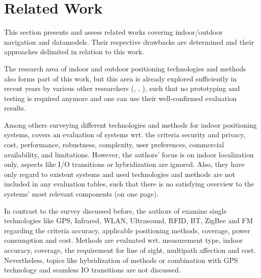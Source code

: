 \chapter{Related Work}


This section presents and assess related works covering indoor/outdoor navigation and datamodels. Their respective drawbacks are determined and their approaches delimited in relation to this work.

The research area of indoor and outdoor positioning technologies and methods also forms part of this work, but this area is already explored sufficiently in recent years by various other researchers (\cite{seamlessIOsolutions}, \cite{surveyIPS}, \cite{recentAdvances}), such that no prototyping and testing is required anymore and one can use their well-confirmed evaluation results.

Among others surveying different technologies and methods for indoor positioning systems, \cite{surveyIPS} covers an evaluation of systems wrt. the criteria security and privacy, cost, performance, robustness, complexity, user preferences, commercial availability, and limitations. However, the authors' focus is on indoor localization only, aspects like I/O transitions or hybridization are ignored. Also, they have only regard to existent systems and used technologies and methods are not included in any evaluation tables, such that there is no satisfying overview to the systems' most relevant components (on one page).

In contrast to the survey discussed before, the authors of \cite{recentAdvances} examine single technologies like GPS, Infrared, WLAN, Ultrasound, RFID, BT, ZigBee and FM regarding the criteria accuracy, applicable positioning methods, coverage, power consumption and cost. Methods are evaluated wrt. measurement type, indoor accuracy, coverage, the requirement for line of sight, multipath affection and cost. Nevertheless, topics like hybridization of methods or combination with GPS technology and seamless IO transitions are not discussed.



